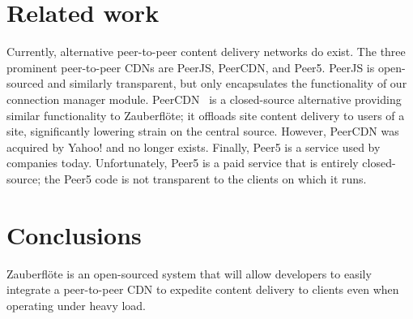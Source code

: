 \documentclass[letterpaper,twocolumn,10pt]{article}
\newcommand{\zbf}{Zauberfl\"{o}te\xspace}
\begin{document}
\section{Related work}

Currently, alternative peer-to-peer content delivery networks do exist. The three
prominent peer-to-peer CDNs are PeerJS, PeerCDN, and Peer5. PeerJS is open-sourced
and similarly transparent, but only encapsulates the functionality of our connection manager
module. PeerCDN~\cite{peercdn} is a closed-source alternative providing  similar
functionality to \zbf; it offloads site content delivery to users of a site,
significantly lowering strain on the central source. However, PeerCDN was acquired by
Yahoo! and no longer exists. Finally, Peer5 is a service used by companies today.
Unfortunately, Peer5 is a paid service that is entirely closed-source; the Peer5 code is
not transparent to the clients on which it runs.

\section{Conclusions}

\zbf is an open-sourced system
that will allow developers to easily integrate a peer-to-peer CDN to expedite
content delivery to clients even when operating under heavy load.



{\footnotesize 
}
\end{document}
